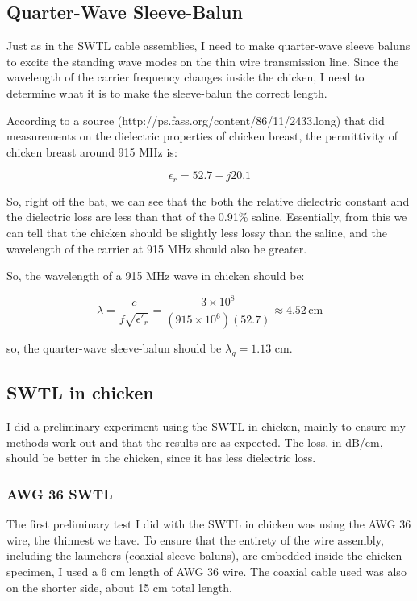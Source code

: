 \documentclass[12pt,onecolumn,titlepage]{article}
\begin{document}
\subsection{Quarter-Wave Sleeve-Balun}
\indent \indent Just as in the SWTL cable assemblies, I need to make quarter-wave sleeve baluns to excite the standing wave modes on the thin wire transmission line. Since the wavelength of the carrier frequency changes inside the chicken, I need to determine what it is to make the sleeve-balun the correct length.

According to a source (http://ps.fass.org/content/86/11/2433.long) that did measurements on the dielectric properties of chicken breast, the permittivity of chicken breast around 915 MHz is: 

\begin{equation}
\epsilon_r = 52.7 - j 20.1
\end{equation}

So, right off the bat, we can see that the both the relative dielectric constant and the dielectric loss are less than that of the 0.91\% saline. Essentially, from this we can tell that the chicken should be slightly less lossy than the saline, and the wavelength of the carrier at 915 MHz should also be greater. 

So, the wavelength of a 915 MHz wave in chicken should be:

\[ \lambda = \frac{c}{f \sqrt{\epsilon'_r}} = \frac{3 \times 10^8}{\left( 915 \times 10^6 \right) \left( 52.7 \right) }  \approx 4.52 \, \text{cm} \]

so, the quarter-wave sleeve-balun should be $\lambda_g = 1.13$ cm.




\subsection{SWTL in chicken}
\indent \indent I did a preliminary experiment using the SWTL in chicken, mainly to ensure my methods work out and that the results are as expected. The loss, in dB/cm, should be better in the chicken, since it has less dielectric loss.


\subsubsection{AWG 36 SWTL}
\indent \indent The first preliminary test I did with the SWTL in chicken was using the AWG 36 wire, the thinnest we have. To ensure that the entirety of the wire assembly, including the launchers (coaxial sleeve-baluns), are embedded inside the chicken specimen, I used a 6 cm length of AWG 36 wire. The coaxial cable used was also on the shorter side, about 15 cm total length. 
\end{document}
